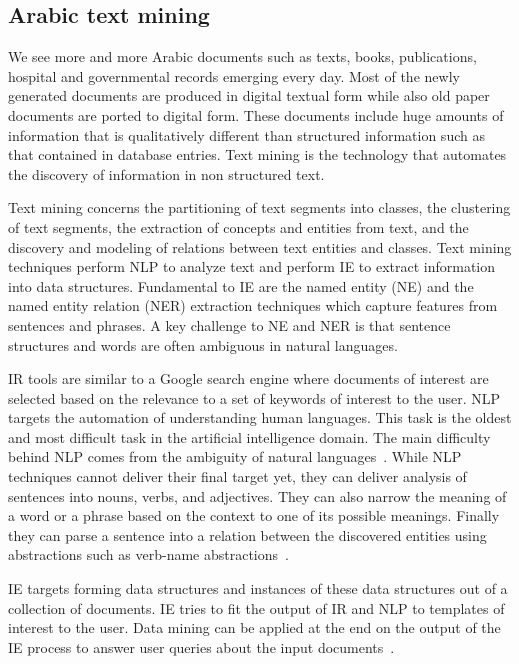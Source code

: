 \documentclass[12pt]{article}
\begin{document}
\subsection{Arabic text mining}
\label{s:design:atm}

We see more and more Arabic documents such as texts,
books, publications, hospital and governmental records emerging 
every day.
Most of the newly generated documents are produced in digital 
textual form while also old paper documents are ported to digital 
form.
These documents include huge amounts of information that is 
qualitatively different than structured information such as that 
contained in database entries.
Text mining is the technology that automates the discovery of 
information in non structured text.

Text mining concerns the partitioning of text segments 
into classes,
the clustering of text segments,
the extraction of concepts and entities from text,
and the discovery and modeling of relations between text entities 
and classes.
Text mining techniques perform NLP to analyze text and perform 
IE to extract information into data structures.
Fundamental to IE are the named entity (NE) and the named entity 
relation (NER) extraction techniques which capture features from 
sentences and phrases.
A key challenge to NE and NER is that sentence structures and 
words are often ambiguous in natural languages.

IR tools are similar to a Google search 
engine where documents of interest are selected based on the 
relevance to a set of keywords of interest to the user.
NLP targets the automation of understanding human languages.
This task is the oldest and most difficult task in the artificial 
intelligence domain.
The main difficulty behind NLP comes from the ambiguity of 
natural languages~\cite{Osm08}.
While NLP techniques cannot deliver their final target yet, they 
can deliver analysis of sentences into nouns, verbs, 
and adjectives.
They can also narrow the meaning of a word or a phrase based on 
the context to one of its possible meanings.
Finally they can parse a sentence into a relation between the 
discovered entities using abstractions such as verb-name 
abstractions~\cite{Osm08}.

IE targets forming data structures and instances of these 
data structures out of a collection of documents.
IE tries to fit the output of IR and NLP to templates of 
interest to the user.
Data mining can be applied at the end on the output of the 
IE process to answer user queries about the input 
documents~\cite{JHa05}.
\end{document}
